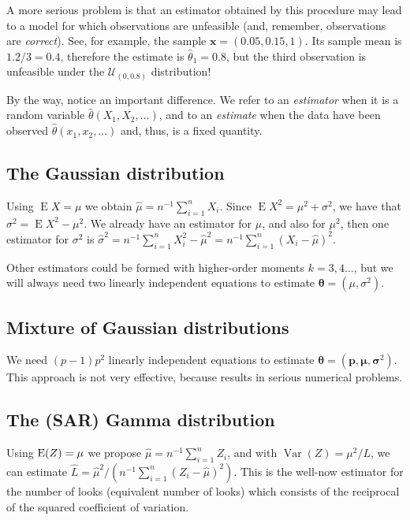 A more serious problem is that an estimator obtained by this procedure may lead to a model for which observations are unfeasible (and, remember, observations are \emph{correct}).
See, for example, the sample $\bm x=(0.05, 0.15, 1)$.
Its sample mean is $1.2/3=0.4$, therefore the estimate is $\widehat{\theta}_1=0.8$, but the third observation is unfeasible under the $\mathcal U_{(0,0.8)}$ distribution!

By the way, notice an important difference.
We refer to an \emph{estimator} when it is a random variable $\widehat{\theta}(X_1, X_2, \dots)$, and to an \emph{estimate} when the data have been observed $\widehat{\theta}(x_1, x_2, \dots)$ and, thus, is a fixed quantity.

\subsection{The Gaussian distribution}

Using $\operatorname{E}X=\mu$ we obtain $\widehat{\mu}=n^{-1}\sum_{i=1}^{n} X_i$.
Since $\operatorname{E}X^2=\mu^2+\sigma^2$, we have that $\sigma^2=\operatorname{E}X^2-\mu^2$.
We already have an estimator for $\mu$, and also for $\mu^2$, then one estimator for $\sigma^2$ is $\widehat{\sigma}^2=n^{-1}\sum_{i=1}^{n}X_i^2-\widehat{\mu}^2 = n^{-1}\sum_{i=1}^{n}(X_i-\widehat{\mu})^2$.

Other estimators could be formed with higher-order moments $k=3,4\dots$, but we will always need two linearly independent equations to estimate $\bm\theta=(\mu,\sigma^2)$.

\subsection{Mixture of Gaussian distributions}

We need $(p-1)p^2$ linearly independent equations to estimate $\bm{\theta} = (\bm p, \bm \mu, \bm \sigma^2)$.
This approach is not very effective, because results in serious numerical problems.

\subsection{The (SAR) Gamma distribution}

Using $\operatorname{E}(Z)=\mu$ we propose $\widehat{\mu}=n^{-1}\sum_{i=1}^n Z_i$,
and with 
$\operatorname{Var}(Z)=\mu^2/L$, we can estimate $\widehat L=\widehat{\mu}^2 / (n^{-1}\sum_{i=1}^n (Z_i - \widehat{\mu})^2)$.
This is the well-now estimator for the number of looks (equivalent number of looks) which consists of the reciprocal of the squared coefficient of variation.

